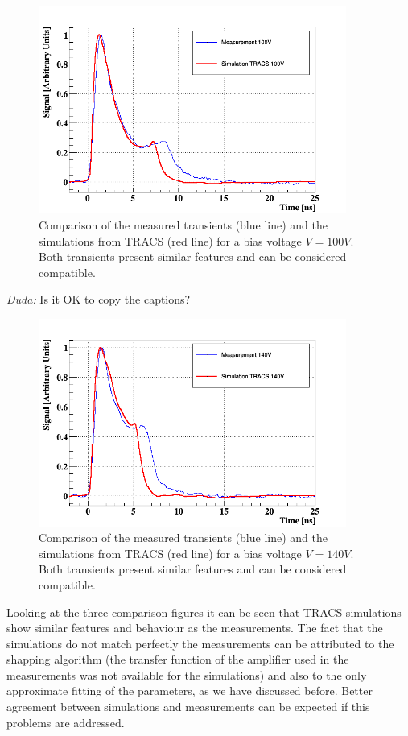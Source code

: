 \begin{figure}[H]
	\centering
	\includegraphics[width=0.9\textwidth]{100V.png}
	\caption{Comparison of the measured transients (blue line) and the simulations from TRACS (red line) for a bias voltage $V = 100V$. Both transients present similar features and can be considered compatible.}
	\label{fig:100v}
\end{figure}

\emph{Duda: } Is it OK to copy the captions?

\begin{figure}[H]
	\centering
	\includegraphics[width=0.9\textwidth]{140V.png}
	\caption{Comparison of the measured transients (blue line) and the simulations from TRACS (red line) for a bias voltage $V = 140V$. Both transients present similar features and can be considered compatible.}
	\label{fig:140v}
\end{figure}

Looking at the three comparison figures it can be seen that TRACS simulations show similar features and behaviour as the measurements. The fact that the simulations do not match perfectly the measurements can be attributed to the shapping algorithm (the transfer function of the amplifier used in the measurements was not available for the simulations) and also to the only approximate fitting of the parameters, as we have discussed before. Better agreement between simulations and measurements can be expected if this problems are addressed.

